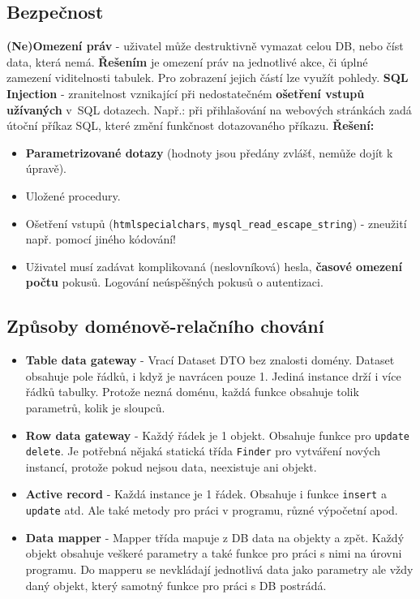\subsection{Bezpečnost}
\textbf{(Ne)Omezení práv} - uživatel může destruktivně vymazat celou DB, nebo číst data, která nemá. \textbf{Řešením} je omezení práv na jednotlivé akce, či úplné zamezení viditelnosti tabulek. Pro zobrazení jejich částí lze využít pohledy.
\textbf{SQL Injection} - zranitelnost vznikající při nedostatečném \textbf{ošetření vstupů užívaných} v SQL dotazech. Např.: při přihlašování na webových stránkách zadá útoční příkaz SQL, které změní funkčnost dotazovaného příkazu. \textbf{Řešení:}
\begin{itemize}
\item \textbf{Parametrizované dotazy} (hodnoty jsou předány zvlášť, nemůže dojít k úpravě).
\item Uložené procedury.
\item Ošetření vstupů (\texttt{htmlspecialchars}, \texttt{mysql\_read\_escape\_string}) - zneužití např. pomocí jiného kódování!
\item Uživatel musí zadávat komplikovaná (neslovníková) hesla, \textbf{časové omezení počtu} pokusů. Logování neúspěšných pokusů o autentizaci.
\end{itemize}

\subsection{Způsoby doménově-relačního chování}
\begin{itemize}
    \item \textbf{Table data gateway} - Vrací Dataset DTO bez znalosti domény. Dataset obsahuje pole řádků, i když je navrácen pouze 1. Jediná instance drží i více řádků tabulky. Protože nezná doménu, každá funkce obsahuje tolik parametrů, kolik je sloupců. 
    \item \textbf{Row data gateway} - Každý řádek je 1 objekt. Obsahuje funkce pro \texttt{update} \texttt{delete}. Je potřebná nějaká statická třída \texttt{Finder} pro vytváření nových instancí, protože pokud nejsou data, neexistuje ani objekt.
    \item \textbf{Active record} - Každá instance je 1 řádek. Obsahuje i funkce \texttt{insert} a \texttt{update} atd. Ale také metody pro práci v programu, různé výpočetní apod.
    \item \textbf{Data mapper} - Mapper třída mapuje z DB data na objekty a zpět. Každý objekt obsahuje veškeré parametry a také funkce pro práci s nimi na úrovni programu. Do mapperu se nevkládají jednotlivá data jako parametry ale vždy daný objekt, který samotný funkce pro práci s DB postrádá.
\end{itemize}
